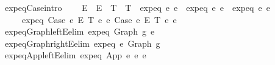 \begin{isabellebody}
{\isacharbar}{\kern0pt}\ expeq{\isacharunderscore}{\kern0pt}Case{\isacharbrackleft}{\kern0pt}intro{\isacharbrackright}{\kern0pt}{\isacharcolon}{\kern0pt}\isanewline
\ \ \ \ {\isachardoublequoteopen}E{}\ {\isacharequal}{\kern0pt}\ E{}\ {\isacharequal}{\kern0pt}{\isacharequal}{\kern0pt}{\isachargreater}{\kern0pt}\ T{}\ {\isacharequal}{\kern0pt}\ T{}\ {\isacharequal}{\kern0pt}{\isacharequal}{\kern0pt}{\isachargreater}{\kern0pt}\ expeq\ e{}{}\ e{}{}\ {\isacharequal}{\kern0pt}{\isacharequal}{\kern0pt}{\isachargreater}{\kern0pt}\ expeq\ e{}{}\ e{}{}\ {\isacharequal}{\kern0pt}{\isacharequal}{\kern0pt}{\isachargreater}{\kern0pt}\ expeq\ e{}{}\ e{}{}\ {\isacharequal}{\kern0pt}{\isacharequal}{\kern0pt}{\isachargreater}{\kern0pt}\isanewline
\ \ \ \ \ expeq\ {\isacharparenleft}{\kern0pt}Case\ e{}{}\ E{}\ T{}\ e{}{}\ e{}{}{\isacharparenright}{\kern0pt}\ {\isacharparenleft}{\kern0pt}Case\ e{}{}\ E{}\ T{}\ e{}{}\ e{}{}{\isacharparenright}{\kern0pt}{\isachardoublequoteclose}\isanewline
\isanewline
\isanewline
{}\isamarkupfalse%
\ expeq{\isacharunderscore}{\kern0pt}Graph{\isacharunderscore}{\kern0pt}leftE{\isacharbrackleft}{\kern0pt}elim{\isacharbang}{\kern0pt}{\isacharbrackright}{\kern0pt}{\isacharcolon}{\kern0pt}\ {\isachardoublequoteopen}expeq\ {\isacharparenleft}{\kern0pt}Graph\ g{}{\isacharparenright}{\kern0pt}\ e{}{\isachardoublequoteclose}\isanewline
{}\isamarkupfalse%
\ expeq{\isacharunderscore}{\kern0pt}Graph{\isacharunderscore}{\kern0pt}rightE{\isacharbrackleft}{\kern0pt}elim{\isacharbang}{\kern0pt}{\isacharbrackright}{\kern0pt}{\isacharcolon}{\kern0pt}\ {\isachardoublequoteopen}expeq\ e{}\ {\isacharparenleft}{\kern0pt}Graph\ g{}{\isacharparenright}{\kern0pt}{\isachardoublequoteclose}\isanewline
{}\isamarkupfalse%
\ expeq{\isacharunderscore}{\kern0pt}App{\isacharunderscore}{\kern0pt}leftE{\isacharbrackleft}{\kern0pt}elim{\isacharbang}{\kern0pt}{\isacharbrackright}{\kern0pt}{\isacharcolon}{\kern0pt}\ {\isachardoublequoteopen}expeq\ {\isacharparenleft}{\kern0pt}App\ e{}{}\ e{}{}{\isacharparenright}{\kern0pt}\ e{}{\isachardoublequoteclose}\isanewline

\end{isabellebody}
